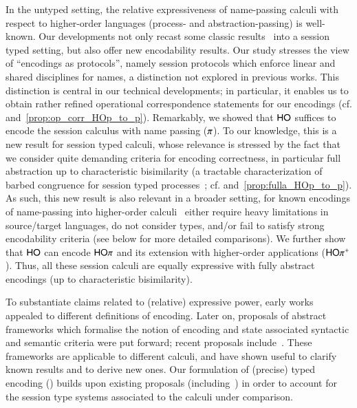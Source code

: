In the untyped setting, the relative expressiveness of name-passing calculi with respect to 
higher-order languages (process- and abstraction-passing) is well-known. 
Our developments not only recast some classic results~\cite{SangiorgiD:expmpa} into a session typed setting, but 
also offer new encodability results.
Our study stresses the 
view of ``encodings as protocols'', namely session protocols which
enforce  linear and shared disciplines for names, a distinction
not explored in %
previous works.
This distinction is central 
in our technical developments; in particular, it enables us to obtain 
rather refined 
operational correspondence statements for our encodings (cf.  and~\ref{prop:op_corr_HOp_to_p}).
Remarkably, we showed that
$\mathsf{HO}$ suffices to encode  the session
calculus with name passing ($\pi$).
To our knowledge, this is a new result for session typed calculi, whose relevance is stressed by the fact that 
we consider quite demanding criteria for encoding correctness, in particular full abstraction up to characteristic bisimilarity (a tractable characterization of barbed congruence for session typed processes~\cite{characteristic_bis}; cf.  and~\ref{prop:fulla_HOp_to_p}).
As such, this new result is also relevant in a broader setting, for known encodings 
of name-passing into higher-order calculi~\cite{SaWabook,BundgaardHG06,DBLP:journals/entcs/MeredithR05,XuActa2012,DBLP:journals/corr/XuYL15} either require heavy limitations
in source/target languages,
do not consider types,
 and/or fail to satisfy strong encodability criteria (see below for more detailed comparisons). 
We further show that $\mathsf{HO}$ can encode $\mathsf{HO}\pi$ and its extension with
higher-order applications ($\mathsf{HO\pi^{+}}$). 
Thus, %
all these session calculi are equally expressive with fully
abstract encodings (up to characteristic bisimilarity).  


To substantiate claims related to (relative) expressive power,
early works appealed to different definitions of encoding.
Later on, 
proposals of abstract 
frameworks which formalise the notion of encoding 
and state associated syntactic and semantic criteria 
were put forward; 
recent proposals include~\cite{DBLP:journals/iandc/Gorla10,DBLP:journals/tcs/FuL10,DBLP:journals/corr/abs-1208-2750,DBLP:conf/esop/PetersNG13,DBLP:journals/corr/PetersG15}. 
These frameworks are applicable to different calculi, and 
have shown useful to clarify known results and to derive new ones.
Our formulation of (precise) typed encoding () 
builds upon existing proposals (including~\cite{Palamidessi03,DBLP:journals/iandc/Gorla10,DBLP:conf/icalp/LanesePSS10})
in order to account for the session type systems
associated to the calculi under comparison.


